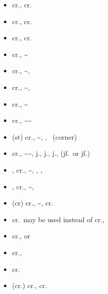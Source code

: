 \documentclass[a4paper,8pt,onecolumn]{letter}
\begin{document}
\begin{multicols}{2}
\begin{tcolorbox}[width=1.00\linewidth,title=lights]
\begin{itemize}
\item cr.\lkick, cr.\lpunch\cancel \qcb\lpunch
\item cr.\lkick, cr.\lpunch\cancel \dragonpunch\hkick
\item cr.\lkick, cr.\lpunch\cancel \qcb\expunch
\item cr.\lpunch, \lpunch\~\mpunch\cancel \dragonpunch\hkick
\item cr.\lpunch, \lpunch\~\mpunch\cancel \qcb\mkick, \lkick
\item cr.\lpunch, \lpunch\~\mpunch\cancel \qcb\exkick, \dragonpunch\hkick
\item cr.\lpunch, \lpunch\~\mpunch\cancel \qcb\hpunch
\item cr.\lpunch, \lpunch\~\mpunch\~\vstwo
\item (st) cr.\lpunch, \lpunch\~ \mpunch\cancel \qcb\hkick, \hkick, \qcb\expunch\ (corner)\dragonpunch\exkick
\item cr.\lpunch, \lpunch\~\mpunch\~\vstwo\cancel\up, j.\lpunch, j.\mpunch, j.\hpunch, (jf.\hpunch\ or jf.\hpunch\cancel \qcf\expunch)
\item \vsone, cr.\lpunch, \lpunch\~\mkick\cancel\qcb\hkick, \hkick, \qcf\expunch, \qcf\hpunch
\item \vsone, cr.\lpunch, \lpunch\~\mpunch\cancel \qcf\expunch, \dragonpunch\hkick
\item (cr) cr.\lpunch, \lpunch\~\mpunch\cancel \qcb\mpunch, cr.\lpunch\cancel \dragonpunch\hkick
\end{itemize}
\end{tcolorbox}

\columnbreak

\begin{tcolorbox}[width=1.00\linewidth,title=mediums]
\begin{itemize}
\item cr.\mpunch\ may be used instead of cr.\lpunch, \lpunch
\item cr.\mkick\cancel \qcb\lkick, \lkick or \mkick
\item cr.\mkick\cancel \qcb\exkick, \dragonpunch\hkick
\item cr.\mkick\cancel \dragonpunch\hkick
\item (cr.) cr.\mkick\cancel \qcb\mpunch, cr.\lpunch\cancel \dragonpunch\hkick
\end{itemize}
\end{tcolorbox}


\end{multicols}
\end{document}
